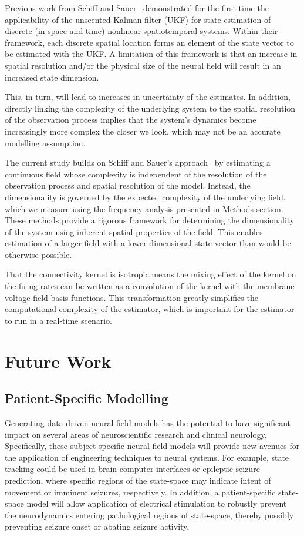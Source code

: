 \documentclass[12pt]{iopart}
\begin{document}
Previous work from Schiff and Sauer~\cite{schiff2008kalman} demonstrated for the first time the applicability of the unscented Kalman filter (UKF) for state estimation of discrete (in space and time) nonlinear spatiotemporal systems. Within their framework, each discrete spatial location forms an element of the state vector to be estimated with the UKF. A limitation of this framework is that an increase in spatial resolution and/or the physical size of the neural field will result in an increased state dimension. 

This, in turn, will lead to increases in uncertainty of the estimates. In addition, directly linking the complexity of the underlying system to the spatial resolution of the observation process implies that the system's dynamics become increasingly more complex the closer we look, which may not be an accurate modelling assumption.

The current study builds on Schiff and Sauer's approach~\cite{schiff2008kalman} by estimating a continuous field whose complexity is independent of the resolution of the observation process and spatial resolution of the model. Instead, the dimensionality is governed by the expected complexity of the underlying field, which we measure using the frequency analysis presented in Methods section. These methods provide a rigorous framework for determining the dimensionality of the system using inherent spatial properties of the field. This enables estimation of a larger field with a lower dimensional state vector than would be otherwise possible. 

That the connectivity kernel is isotropic means the mixing effect of the kernel on the firing rates can be written as a convolution of the kernel with the membrane voltage field basis functions. This transformation greatly simplifies the computational complexity of the estimator, which is important for the estimator to run in a real-time scenario.


\section{Future Work}

\subsection{Patient-Specific Modelling}

Generating data-driven neural field models has the potential to have significant impact on several areas of neuroscientific research and clinical neurology. Specifically, these subject-specific neural field models will provide new avenues for the application of engineering techniques to neural systems. For example, state tracking could be used in brain-computer interfaces or epileptic seizure prediction, where specific regions of the state-space may indicate intent of movement or imminent seizures, respectively. In addition, a patient-specific state-space model will allow application of electrical stimulation to robustly prevent the neurodynamics entering pathological regions of state-space, thereby possibly preventing seizure onset or abating seizure activity.
\end{document}

